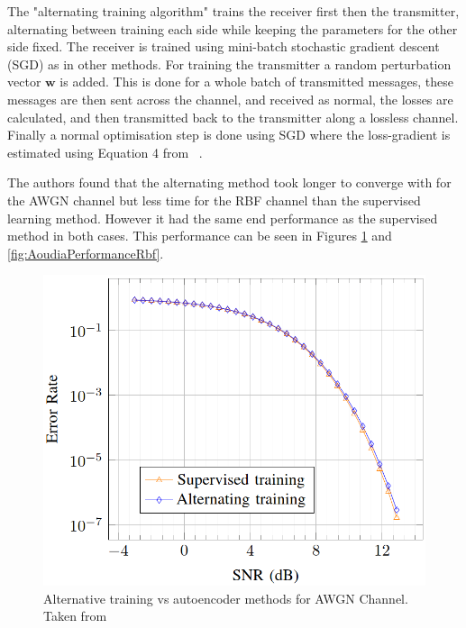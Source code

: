 \documentclass[12pt,onecolumn,letterpaper]{article}
\newcommand\genfigsize{0.5}
\begin{document}
The "alternating training algorithm" trains the receiver first then the transmitter, alternating between training each side while keeping the parameters for the other side fixed. The receiver is trained using mini-batch stochastic gradient descent (SGD) as in other methods. For training the transmitter a random perturbation vector $\mathbf{w}$ is added. This is done for a whole batch of transmitted messages, these messages are then sent across the channel, and received as normal, the losses are calculated, and then transmitted back to the transmitter along a lossless channel. Finally a normal optimisation step is done using SGD where the loss-gradient is estimated using Equation 4 from ~\cite{Aoudia}. 

The authors found that the alternating method took longer to converge with for the AWGN channel but less time for the RBF channel than the supervised learning method. However it had the same end performance as the supervised method in both cases. This performance can be seen in Figures \ref{fig:AoudiaPerformanceAwgn} and \ref{fig:AoudiaPerformanceRbf}.

\begin{figure}[t]
   \centering
   \includegraphics[width=\genfigsize\linewidth]{figures/Aoudia_AWGN_performance.PNG}
   \caption{Alternative training vs autoencoder methods for AWGN Channel. Taken from~\cite{Aoudia}}
\label{fig:AoudiaPerformanceAwgn}
\end{figure}
\end{document}
